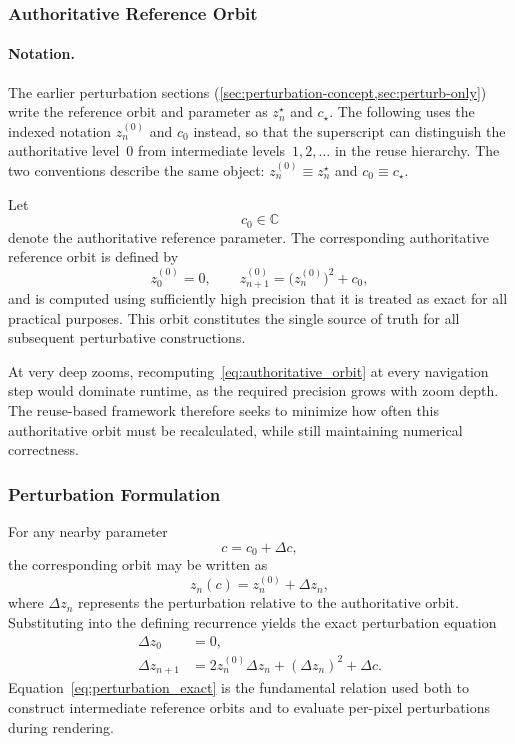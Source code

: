 \subsubsection{Authoritative Reference Orbit}

\paragraph{Notation.}
The earlier perturbation sections
(\cref{sec:perturbation-concept,sec:perturb-only})
write the reference orbit and parameter as
\(z_n^\star\) and \(c_\star\).
The following uses the indexed notation
\(z^{(0)}_n\) and \(c_0\) instead, so that the superscript can
distinguish the authoritative level~\(0\) from intermediate
levels~\(1,2,\ldots\) in the reuse hierarchy.
The two conventions describe the same object:
\(z^{(0)}_n \equiv z_n^\star\) and \(c_0 \equiv c_\star\).

Let
\[
c_0 \in \mathbb{C}
\]
denote the authoritative reference parameter.
The corresponding authoritative reference orbit is defined by
\begin{equation}
z^{(0)}_0 = 0, \qquad
z^{(0)}_{n+1} = \bigl(z^{(0)}_n\bigr)^2 + c_0,
\label{eq:authoritative_orbit}
\end{equation}
and is computed using sufficiently high precision that it is treated as exact for all practical purposes.
This orbit constitutes the single source of truth for all subsequent perturbative constructions.

At very deep zooms, recomputing~\eqref{eq:authoritative_orbit} at every navigation step would dominate runtime,
as the required precision grows with zoom depth.
The reuse-based framework therefore seeks to minimize how often this authoritative orbit must be recalculated,
while still maintaining numerical correctness.

\subsubsection{Perturbation Formulation}

For any nearby parameter
\[
c = c_0 + \Delta c,
\]
the corresponding orbit may be written as
\[
z_n(c) = z^{(0)}_n + \Delta z_n,
\]
where $\Delta z_n$ represents the perturbation relative to the authoritative orbit.
Substituting into the defining recurrence yields the exact perturbation equation
\begin{align}
\Delta z_0 &= 0, \label{eq:perturbation-init} \\
\Delta z_{n+1}
&= 2 z^{(0)}_n \Delta z_n + (\Delta z_n)^2 + \Delta c.
\label{eq:perturbation_exact}
\end{align}
Equation~\eqref{eq:perturbation_exact} is the fundamental relation used both to construct intermediate reference orbits
and to evaluate per-pixel perturbations during rendering.

